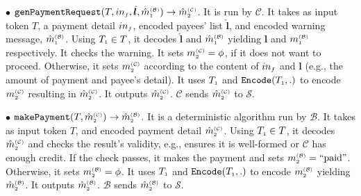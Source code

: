 \begin{definition}
%
\vspace{2mm}
\item  [$\bullet$] $\mathtt{genPaymentRequest}(T, in_{\scriptscriptstyle f}, \hat{\bm{l}}, \hat m^{\scriptscriptstyle\mathcal{(B)}}_{\scriptscriptstyle1})\rightarrow \hat m^{\scriptscriptstyle\mathcal{(C)}}_{\scriptscriptstyle2}$. It is  run by $\mathcal{C}$. It takes as input token $T$, a payment detail $in_{\scriptscriptstyle f}$, encoded payees' list $\hat{\bm{l}}$, and encoded warning message,  $\hat m^{\scriptscriptstyle\mathcal{(B)}}_{\scriptscriptstyle1}$. Using $T_{\scriptscriptstyle 1}\in T$, it decodes  $\hat{\bm{l}}$ and $\hat m^{\scriptscriptstyle\mathcal{(B)}}_{\scriptscriptstyle1}$ yielding ${\bm{l}}$ and $m^{\scriptscriptstyle\mathcal{(B)}}_{\scriptscriptstyle1}$ respectively. It checks the warning.  It sets   $m^{\scriptscriptstyle\mathcal{(C)}}_{\scriptscriptstyle2}=\phi$, if it does not want to proceed. Otherwise, it  sets $m^{\scriptscriptstyle\mathcal{(C)}}_{\scriptscriptstyle2}$ according to the content of $in_{\scriptscriptstyle f}$ and  ${\bm{l}}$ (e.g., the amount of payment and payee's detail). It uses $T_{\scriptscriptstyle 1}$ and  $\mathtt{Encode}(T_{\scriptscriptstyle 1}, .)$ to encode $m^{\scriptscriptstyle\mathcal{(C)}}_{\scriptscriptstyle2}$ resulting in $\hat m^{\scriptscriptstyle\mathcal{(C)}}_{\scriptscriptstyle2}$. It outputs $\hat m^{\scriptscriptstyle\mathcal{(C)}}_{\scriptscriptstyle2}$. $\mathcal{C}$ sends $\hat m^{\scriptscriptstyle\mathcal{(C)}}_{\scriptscriptstyle2}$ to $\mathcal{S}$. 
%
\vspace{2mm}
\item  [$\bullet$] $\mathtt{makePayment}(T, \hat m^{\scriptscriptstyle\mathcal{(C)}}_{\scriptscriptstyle2})\rightarrow \hat m^{\scriptscriptstyle\mathcal{(B)}}_{\scriptscriptstyle2}$. It is a deterministic algorithm run by $\mathcal{B}$. It takes as input token $T$,  and encoded payment  detail $\hat m^{\scriptscriptstyle\mathcal{(C)}}_{\scriptscriptstyle2}$. Using $T_{\scriptscriptstyle 1}\in T$, it decodes $\hat m^{\scriptscriptstyle\mathcal{(C)}}_{\scriptscriptstyle2}$ and  checks the result's validity, e.g., ensures it is well-formed or $\mathcal{C}$ has enough credit. If the check  passes,  it makes the payment and  sets $m^{\scriptscriptstyle\mathcal{(B)}}_{\scriptscriptstyle2}=\text{``paid''}$. Otherwise, it sets $m^{\scriptscriptstyle\mathcal{(B)}}_{\scriptscriptstyle2}=\phi$. It uses $T_{\scriptscriptstyle 1}$ and  $\mathtt{Encode}(T_{\scriptscriptstyle 1}, .)$ to encode $m^{\scriptscriptstyle\mathcal{(B)}}_{\scriptscriptstyle2}$ yielding $\hat m^{\scriptscriptstyle\mathcal{(B)}}_{\scriptscriptstyle2}$. It outputs $\hat m^{\scriptscriptstyle\mathcal{(B)}}_{\scriptscriptstyle2}$. $\mathcal{B}$ sends $\hat m^{\scriptscriptstyle\mathcal{(B)}}_{\scriptscriptstyle2}$ to $\mathcal{S}$.
%
\vspace{2mm}

\end{definition}
